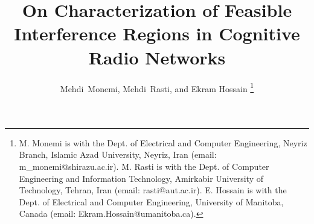 \documentclass[journal,twoside]{IEEEtran}
\begin{document}
\raggedbottom

\title{On Characterization of Feasible Interference Regions in Cognitive Radio Networks}

\author{Mehdi~Monemi, Mehdi~Rasti, and Ekram Hossain
\thanks{M. Monemi is with the Dept. of Electrical and Computer Engineering,  Neyriz Branch, Islamic Azad University,  Neyriz, Iran (email: m\_monemi@shirazu.ac.ir). M. Rasti is with the Dept. of Computer Engineering and Information Technology, Amirkabir University of Technology, Tehran, Iran (email: rasti@aut.ac.ir).
E. Hossain is with the Dept. of Electrical and Computer Engineering, University of Manitoba, Canada (email: Ekram.Hossain@umanitoba.ca).}
}

	
\maketitle
\end{document}
